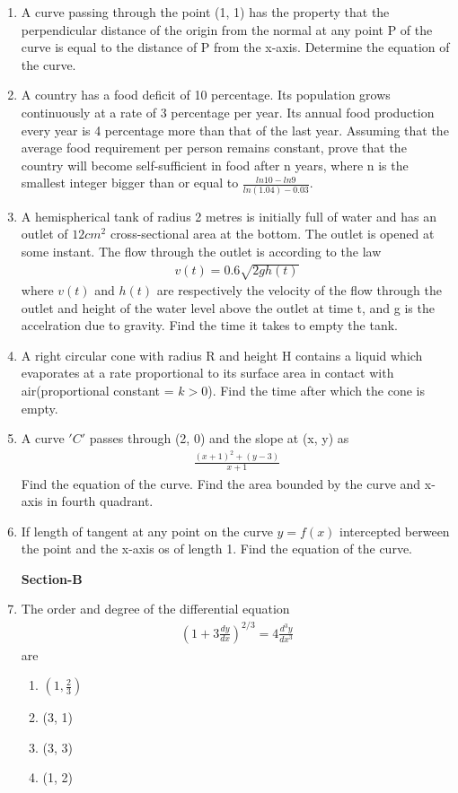 \begin{enumerate}[label=\arabic*.,ref=\thesubsection.\theenumi]
\item A curve passing through the point (1, 1) has the property that the perpendicular distance of the origin from the normal at any point P of the curve is equal to the distance of P from the x-axis. Determine the equation of the curve.

\item A country has a food deficit of 10 percentage. Its population grows continuously at a rate of 3 percentage per year. Its annual food production every year is 4 percentage more than that of the last year. Assuming that the average food requirement per person remains constant, prove that the country will become self-sufficient in food after n years, where n is the smallest integer bigger than or equal to $\frac{ln 10 - ln 9}{ln(1.04) - 0.03}$.

\item A hemispherical tank of radius 2 metres is initially full of water and has an outlet of $12cm^{2}$ cross-sectional area at the bottom. The outlet is opened at some instant. The flow through the outlet is according to the law 
\begin{align*}
v(t) = 0.6\sqrt{2gh(t)}
\end{align*}
where $v(t)$ and $h(t)$ are respectively the velocity of the flow through the outlet and height of the water level above the outlet at time t, and g is the accelration due to gravity. Find the time it takes to empty the tank.

\item A right circular cone with radius R and height H contains a liquid which evaporates at a rate proportional to its surface area in contact with air(proportional constant = $k > 0$). Find the time after which the cone is empty.

\item A curve $'C'$ passes through (2, 0) and the slope at (x, y) as 
\begin{align*}
\frac{(x + 1)^2 + (y - 3)}{x + 1}
\end{align*}
Find the equation of the curve. Find the area bounded by the curve and x-axis in fourth quadrant.

\item If length of tangent at any point on the curve $y = f(x)$ intercepted berween the point and the x-axis os of length 1. Find the equation of the curve.

\textbf{Section-B}

\item The order and degree of the differential equation
\begin{align*}
\left(1 + 3\frac{dy}{dx}\right)^{2/3} = 4\frac{d^{3}y}{dx^{3}}
\end{align*}
 are
\begin{enumerate}
\item $\left(1, \frac{2}{3}\right)$
\item (3, 1)
\item (3, 3)
\item (1, 2) 
\end{enumerate}


\end{enumerate}
